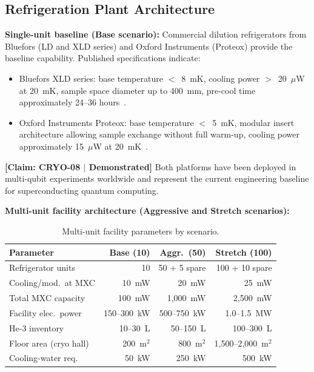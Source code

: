 \documentclass[conference]{IEEEtran}
\begin{document}
\subsection{Refrigeration Plant Architecture}

\textbf{Single-unit baseline (Base scenario):} Commercial dilution refrigerators from Bluefors (LD and XLD series) and Oxford Instruments (Proteox) provide the baseline capability. Published specifications indicate:

\begin{itemize}
\item Bluefors XLD series: base temperature $<$~8~mK, cooling power $>$~20~$\mu$W at 20~mK, sample space diameter up to 400~mm, pre-cool time approximately 24--36 hours~\cite{Bluefors}.
\item Oxford Instruments Proteox: base temperature $<$~5~mK, modular insert architecture allowing sample exchange without full warm-up, cooling power approximately 15~$\mu$W at 20~mK~\cite{OxfordProteox}.
\end{itemize}

\textbf{[Claim: CRYO-08 $|$ Demonstrated]} Both platforms have been deployed in multi-qubit experiments worldwide and represent the current engineering baseline for superconducting quantum computing.

\textbf{Multi-unit facility architecture (Aggressive and Stretch scenarios):}

\begin{table}[H]
\centering
\caption{Multi-unit facility parameters by scenario.}
\label{tab:facility-params}
\footnotesize
\begin{tabularx}{\columnwidth}{L{2.5cm}rrr}
\toprule
\textbf{Parameter} & \textbf{Base (10)} & \textbf{Aggr.\ (50)} & \textbf{Stretch (100)} \\
\midrule
Refrigerator units & 10 & 50 + 5 spare & 100 + 10 spare \\
Cooling/mod.\ at MXC & 10~mW & 20~mW & 25~mW \\
Total MXC capacity & 100~mW & 1,000~mW & 2,500~mW \\
Facility elec.\ power & 150--300~kW & 500--750~kW & 1.0--1.5~MW \\
He-3 inventory & 10--30~L & 50--150~L & 100--300~L \\
Floor area (cryo hall) & 200~m$^2$ & 800~m$^2$ & 1,500--2,000~m$^2$ \\
Cooling-water req. & 50~kW & 250~kW & 500~kW \\
\bottomrule
\end{tabularx}
\end{table}
\end{document}
